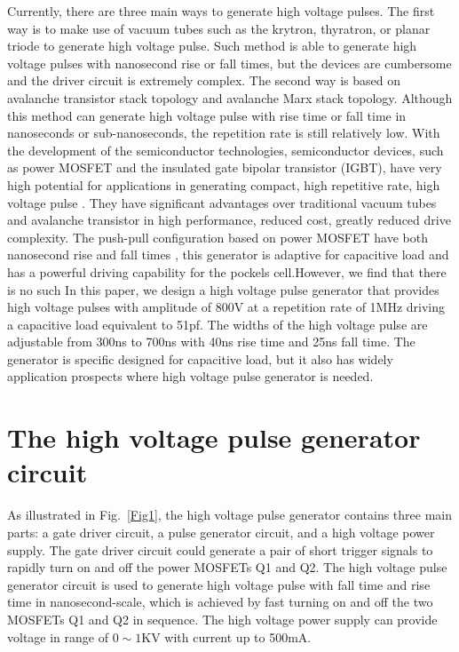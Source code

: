 \documentclass[aip,rsi,reprint,graphicx]{revtex4-1} %
\begin{document}
Currently, there are three main ways to generate high voltage pulses. 
The first way is to make use of vacuum tubes such as the krytron, thyratron, or planar triode to generate high voltage pulse\cite{Rohwein1995improved}. 
Such method is able to generate high voltage pulses with nanosecond rise or fall times, but the devices are cumbersome and the driver circuit is extremely complex. 
The second way is based on avalanche transistor stack topology and avalanche Marx stack topology\cite{Fulkerson1997,Bidin2009}. 
Although this method can generate high voltage pulse with rise time or fall time in nanoseconds or sub-nanoseconds, the repetition rate is still relatively low. 
With the development of the semiconductor technologies, semiconductor devices, such as power MOSFET and the insulated gate bipolar transistor (IGBT), have very high potential for applications in generating compact, high repetitive rate, high voltage pulse \cite{wang2013semiconductor,Feng2011}. 
They have significant advantages over traditional vacuum tubes and avalanche transistor in high performance, reduced cost, greatly reduced drive complexity. 
The push-pull configuration based on power MOSFET have both nanosecond rise and fall times \cite{bernius1990improved}, this generator is adaptive for capacitive load and has a powerful driving capability for the pockels cell.However, we find that there is no such 
In this paper, we design a high voltage pulse generator that provides high voltage pulses with amplitude of 800V at a repetition rate of 1MHz driving a capacitive load equivalent to 51pf. The widths of the high voltage pulse are adjustable from 300ns to 700ns with 40ns rise time and 25ns fall time. The generator is specific designed for capacitive load, but it also has widely application prospects where high voltage pulse generator is needed.

\section{The high voltage pulse generator circuit}
As illustrated in Fig.~\ref{Fig1}, the high voltage pulse generator contains three main parts: a gate driver circuit, a pulse generator circuit, and a high voltage power supply. The gate driver circuit could generate a pair of short trigger signals to rapidly turn on and off the power MOSFETs Q1 and Q2. The high voltage pulse generator circuit is used to generate high voltage pulse with fall time and rise time in nanosecond-scale, which is achieved by fast turning on and off the two MOSFETs Q1 and Q2 in sequence. The high voltage power supply can provide voltage in range of $0\sim1$KV with current up to 500mA.
\end{document}
